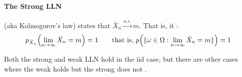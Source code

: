 \documentclass[11pt,a4paper]{article}
\theoremstyle{definition}
\renewcommand\right\mright%
\renewcommand\left\mleft%
\begin{document}
\paragraph{The Strong LLN} (aka Kolmogorov's law) states that
$\bar{X}_n\xrightarrow{a.s.} m$.
That is, it :
\begin{equation*}
  p_{\bar{X}_n}\left( \lim_{n\to\infty}\bar{X}_n = m \right) = 1
  \qquad\text{that is, }
  p\left(\{\omega\in\Omega\mathrel{:} \lim_{n\to\infty}\bar{X}_n = m \}\right) = 1
\end{equation*}

Both the strong and weak LLN hold in the iid case, but there are other cases
where the weak holds but the strong does not
\citep[see][Example 5.4, p.71]{billingsley.p:1995}.

\printbibliography[title=References]{}
\end{document}
